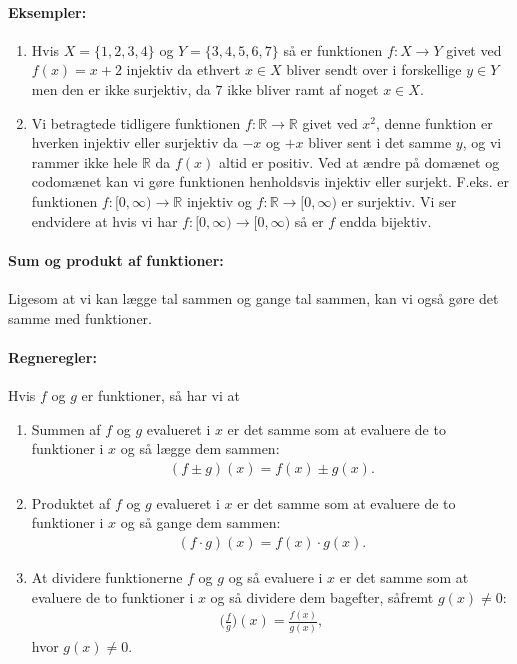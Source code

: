 \paragraph*{Eksempler:}
\begin{enumerate}
\item Hvis $X=\{1,2,3,4\}$ og $Y= \{3,4,5,6,7\}$ så er funktionen $f \colon X \to Y$ givet ved $f(x)=x+2$ injektiv da ethvert $x \in X$ bliver sendt over i forskellige $y \in Y$ men den er ikke surjektiv, da $7$ ikke bliver ramt af noget $x \in X$.
\item Vi betragtede tidligere funktionen $f \colon \mathbb{R} \to \mathbb{R}$ givet ved $x^2$, denne funktion er hverken injektiv eller surjektiv da $-x$ og $+x$ bliver sent i det samme $y$, og vi rammer ikke hele $\mathbb{R}$ da $f(x)$ altid er positiv. Ved at ændre på domænet og codomænet kan vi gøre funktionen henholdsvis injektiv eller surjekt. F.eks. er funktionen $f \colon [0,\infty) \to \mathbb{R}$ injektiv og $f \colon \mathbb{R} \to [0,\infty)$ er surjektiv. Vi ser endvidere at hvis vi har $f \colon [0,\infty) \to [0,\infty)$ så er $f$ endda bijektiv.
\end{enumerate}

\paragraph*{Sum og produkt af funktioner:}
Ligesom at vi kan lægge tal sammen og gange tal sammen, kan vi også gøre det samme med funktioner.

\paragraph*{Regneregler:}
Hvis $f$ og $g$ er funktioner, så har vi at
\begin{enumerate}
\item Summen af $f$ og $g$ evalueret i $x$ er det samme som at evaluere de to funktioner i $x$ og så lægge dem sammen:
\begin{align*}
(f\pm g)(x)=f(x) \pm g(x).
\end{align*}
\item Produktet af $f$ og $g$ evalueret i $x$ er det samme som at evaluere de to funktioner i $x$ og så gange dem sammen: 
\begin{align*}
(f \cdot g)(x)=f(x) \cdot g(x).
\end{align*}
\item At dividere funktionerne $f$ og $g$ og så evaluere i $x$ er det samme som at evaluere de to funktioner i $x$ og så dividere dem bagefter, såfremt $g(x)\neq 0$:
\begin{align*}
\Big(\frac{f}{g}\Big) (x) = \frac{f(x)}{g(x)},
\end{align*}
hvor $g(x) \neq 0$.
\end{enumerate}

